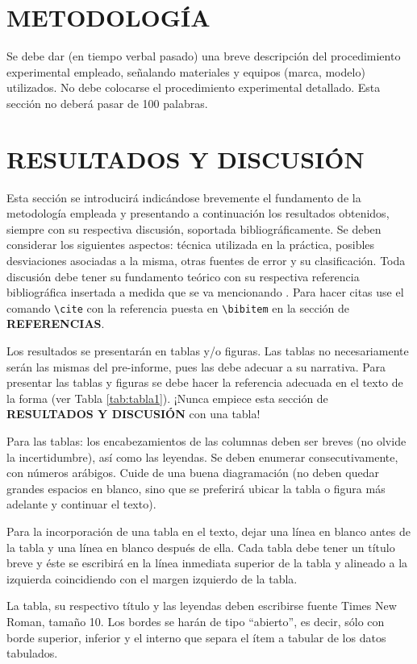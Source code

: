 \documentclass[12pt,letterpaper,twocolumn,twoside]{article}
\begin{document}
\section*{METODOLOGÍA}
Se debe dar (en tiempo verbal pasado) una breve
descripción del procedimiento experimental
empleado, señalando materiales y equipos
(marca, modelo) utilizados. No debe colocarse el 
procedimiento experimental detallado. Esta
sección no deberá pasar de 100 palabras. 

\section*{RESULTADOS Y DISCUSIÓN}

Esta sección se introducirá indicándose brevemente el fundamento de la metodología empleada y presentando a continuación los resultados obtenidos, siempre con su respectiva discusión, soportada bibliográficamente. Se deben considerar los siguientes aspectos: técnica utilizada en la práctica, posibles desviaciones asociadas a la misma, otras fuentes de error y su clasificación. Toda discusión debe tener su fundamento teórico con su respectiva referencia bibliográfica insertada \cite{hasegawa} a medida que se va mencionando \cite{empresa}. Para hacer citas use el comando \verb|\cite| con la referencia puesta en \verb|\bibitem| en la sección de \textbf{REFERENCIAS}.

Los resultados se presentarán en tablas y/o figuras. Las tablas no necesariamente serán las mismas del pre-informe, pues las debe adecuar a su narrativa. Para presentar las tablas y figuras se debe hacer la referencia adecuada en el texto de la forma (ver Tabla \ref{tab:tabla1}). ¡Nunca empiece esta sección de \textbf{RESULTADOS Y DISCUSIÓN} con una tabla!

Para las tablas: los encabezamientos de las columnas deben ser breves (no olvide la incertidumbre), así como las leyendas. Se deben enumerar consecutivamente, con números arábigos. Cuide de una buena diagramación (no deben quedar grandes espacios en blanco, sino que se preferirá ubicar la tabla o figura más adelante y continuar el texto).

Para la incorporación de una tabla en el texto, dejar una línea en blanco antes de la tabla y una línea en blanco después de ella. Cada tabla debe tener un título breve y éste se escribirá en la línea inmediata superior de la tabla y alineado a la izquierda coincidiendo con el margen izquierdo de la tabla.

La tabla, su respectivo título y las leyendas deben escribirse fuente Times New Roman, tamaño 10. Los bordes se harán de tipo “abierto”, es decir, sólo con borde superior, inferior y el interno que separa el ítem a tabular de los datos tabulados.
\end{document}
